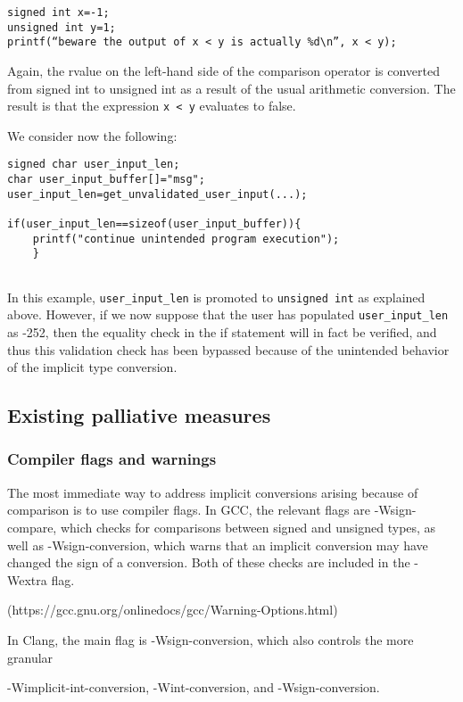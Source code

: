 \documentclass[11pt,letterpaper]{article}
\begin{document}
\begin{lstlisting}[style=CStyle]
signed int x=-1;
unsigned int y=1;
printf(“beware the output of x < y is actually %d\n”, x < y);
\end{lstlisting}

Again, the rvalue on the left-hand side of the comparison operator is converted from signed int to unsigned int as a result of the usual arithmetic conversion.
The result is that the expression \texttt{x < y} evaluates to false.

We consider now the following:

\begin{lstlisting}[style=CStyle]
signed char user_input_len;
char user_input_buffer[]="msg";
user_input_len=get_unvalidated_user_input(...);

if(user_input_len==sizeof(user_input_buffer)){
	printf("continue unintended program execution");
	}	
 	
\end{lstlisting}

In this example,  \texttt{user\_input\_len} is promoted to \texttt{unsigned int} as explained above. However, if we now suppose that the user has populated \texttt{user\_input\_len} as -252, then the equality check in the if statement will in fact be verified, and thus this validation check has been bypassed because of the unintended behavior of the implicit type conversion. 


\subsection{Existing palliative measures}

\subsubsection{Compiler flags and warnings}
The most immediate way to address implicit conversions arising because of comparison is to use compiler flags. In GCC, the relevant flags are -Wsign-compare, which checks for comparisons between signed and unsigned types, as well as -Wsign-conversion, which warns that an implicit conversion may have changed the sign of a conversion. Both of these checks are included in the -Wextra flag.

(https://gcc.gnu.org/onlinedocs/gcc/Warning-Options.html)

In Clang, the main flag is -Wsign-conversion, which also controls the more granular

-Wimplicit-int-conversion, -Wint-conversion, and -Wsign-conversion.
\end{document}
